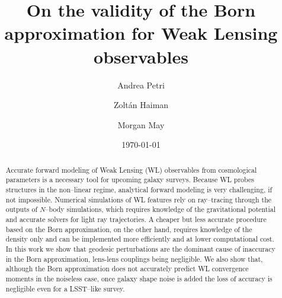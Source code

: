 \documentclass[reprint,aps,prd,superscriptaddress,showkeys,showpacs]{revtex4-1}
\begin{document}
\title{On the validity of the Born approximation for Weak Lensing observables}

\author{Andrea Petri}

\author{Zolt\'an Haiman}

\author{Morgan May}

\date{\today}

\label{firstpage}

\begin{abstract}
Accurate forward modeling of Weak Lensing (WL) observables from cosmological parameters is a necessary tool for upcoming galaxy surveys. Because WL probes structures in the non--linear regime, analytical forward modeling is very challenging, if not impossible. Numerical simulations of WL features rely on ray--tracing through the outputs of $N$--body simulations, which requires knowledge of the gravitational potential and accurate solvers for light ray trajectories. A cheaper but less accurate procedure based on the Born approximation, on the other hand, requires knowledge of the density only and can be implemented more efficiently and at lower computational cost. In this work we show that geodesic perturbations are the dominant cause of inaccuracy in the Born approximation, lens-lens couplings being negligible. We also show that, although the Born approximation does not accurately predict WL convergence moments in the noiseless case, once galaxy shape noise is added the loss of accuracy is negligible even for a LSST--like survey.   
\end{abstract}



\maketitle


\end{document}
